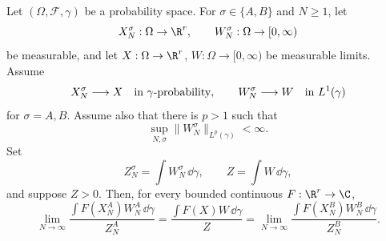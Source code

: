 \begin{lemma}
\label{lem:spde-bounded-cylinder-common-density-limit}
Let \((\Omega,\mathcal F,\gamma)\) be a probability space.  For
\(\sigma\in\{A,B\}\) and \(N\geq1\), let
\[
  X_N^\sigma:\Omega\to\R^r,\qquad W_N^\sigma:\Omega\to[0,\infty)
\]
be measurable, and let \(X:\Omega\to\R^r\), \(W:\Omega\to[0,\infty)\) be
measurable limits.  Assume
\begin{equation}
  X_N^\sigma\longrightarrow X
  \quad\hbox{in }\gamma\hbox{-probability},
  \qquad
  W_N^\sigma\longrightarrow W
  \quad\hbox{in }L^1(\gamma)
  \label{eq:spde-common-density-limit-hypotheses}
\end{equation}
for \(\sigma=A,B\).  Assume also that there is \(p>1\) such that
\begin{equation}
  \sup_{N,\sigma}\|W_N^\sigma\|_{L^p(\gamma)}<\infty .
  \label{eq:spde-common-density-limit-uniform-integrability}
\end{equation}
Set
\[
  Z_N^\sigma=\int W_N^\sigma\,\dd\gamma,
  \qquad
  Z=\int W\,\dd\gamma,
\]
and suppose \(Z>0\).  Then, for every bounded continuous
\(F:\R^r\to\C\),
\begin{equation}
  \lim_{N\to\infty}
  \frac{\int F(X_N^A)W_N^A\,\dd\gamma}{Z_N^A}
  =
  \frac{\int F(X)W\,\dd\gamma}{Z}
  =
  \lim_{N\to\infty}
  \frac{\int F(X_N^B)W_N^B\,\dd\gamma}{Z_N^B}.
  \label{eq:spde-bounded-cylinder-common-density-limit}
\end{equation}
\end{lemma}

